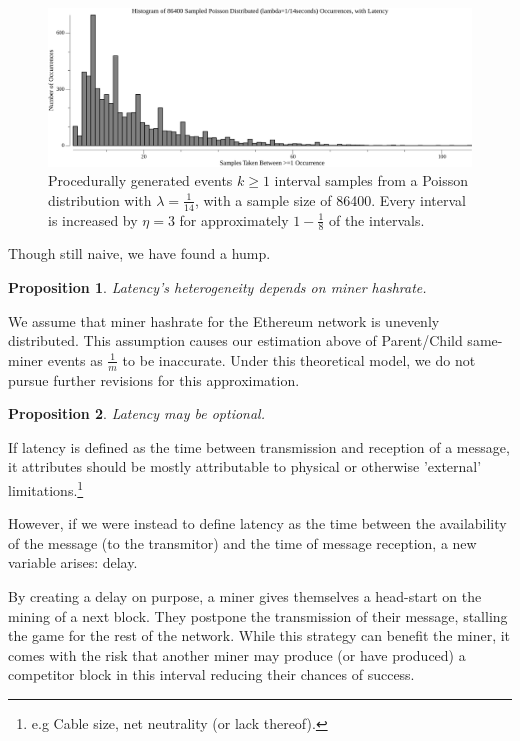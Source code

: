 \documentclass[11pt]{article}
\theoremstyle{plain}
\newtheorem{proposition}{Proposition}[section]
\begin{document}
\begin{figure}[tph]
    \centering

\includegraphics[width=1.0\textwidth]{go-block-step/out/vis_poisson_samples_eventintervals_latencysamesame_hist.png}
    \caption{
      Procedurally generated events $k \geq 1$ interval samples from a Poisson distribution
with $\lambda = \frac{1}{14}$, with a sample size of 86400.
      Every interval is increased by $\eta=3$ for approximately
$1-\frac{1}{8}$ of the intervals.
    }
\end{figure}

Though still naive, we have found a hump.

\vspace{5mm}
\begin{proposition}
  Latency's heterogeneity depends on miner hashrate. %
\end{proposition}

We assume that miner hashrate for the Ethereum network is unevenly distributed.
This assumption causes our estimation above of Parent/Child same-miner events
as $\frac{1}{m}$ to be inaccurate.
Under this theoretical model, we do not pursue further revisions for this
approximation.

\vspace{5mm}
\begin{proposition}
  Latency may be optional.
\end{proposition}

If latency is defined as the time between transmission and reception of a
message, it attributes should be mostly attributable to physical or
otherwise 'external' limitations.\nolinebreak\footnote{
e.g Cable size, net neutrality (or lack thereof).
}

However, if we were instead to define latency as the time between the availability
of the message (to the transmitor) and the time of message reception,
a new variable arises: delay.

By creating a delay on purpose, a miner gives themselves a head-start
on the mining of a next block. They postpone the transmission of their message,
stalling the game for the rest of the network. While this strategy can benefit
the miner, it comes with the risk that another miner may produce (or have
produced) a competitor block in this interval reducing their chances of success.
\end{document}
